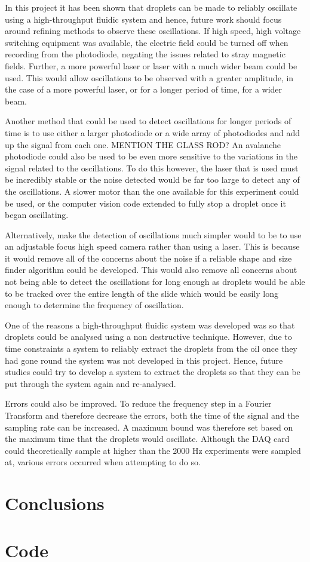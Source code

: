 \documentclass{physics_article_B}
\begin{document}
    In this project it has been shown that droplets can be made to reliably oscillate using a high-throughput fluidic system and hence, future work should focus around refining methods to observe these oscillations. If high speed, high voltage switching equipment was available, the electric field could be turned off when recording from the photodiode, negating the issues related to stray magnetic fields. Further, a more powerful laser or laser with a much wider beam could be used. This would allow oscillations to be observed with a greater amplitude, in the case of a more powerful laser, or for a longer period of time, for a wider beam. 
    
    Another method that could be used to detect oscillations for longer periods of time is to use either a larger photodiode or a wide array of photodiodes and add up the signal from each one. MENTION THE GLASS ROD? An avalanche photodiode could also be used to be even more sensitive to the variations in the signal related to the oscillations. To do this however, the laser that is used must be incredibly stable or the noise detected would be far too large to detect any of the oscillations. A slower motor than the one available for this experiment could be used, or the computer vision code extended to fully stop a droplet once it began oscillating.
    
    Alternatively, make the detection of oscillations much simpler would to be to use an adjustable focus high speed camera rather than using a laser. This is because it would remove all of the concerns about the noise if a reliable shape and size finder algorithm could be developed. This would also remove all concerns about not being able to detect the oscillations for long enough as droplets would be able to be tracked over the entire length of the slide which would be easily long enough to determine the frequency of oscillation. 
    
    One of the reasons a high-throughput fluidic system was developed was so that droplets could be analysed using a non destructive technique. However, due to time constraints a system to reliably extract the droplets from the oil once they had gone round the system was not developed in this project. Hence, future studies could try to develop a system to extract the droplets so that they can be put through the system again and re-analysed.
    
    Errors could also be improved. To reduce the frequency step in a Fourier Transform and therefore decrease the errors, both the time of the signal and the sampling rate can be increased. A maximum bound was therefore set based on the maximum time that the droplets would oscillate. Although the DAQ card could theoretically sample at higher than the 2000 Hz experiments were sampled at, various errors occurred when attempting to do so.
    
    

\section{Conclusions}

\newpage



\newpage
\appendix{}
\section{Code}
\end{document}
